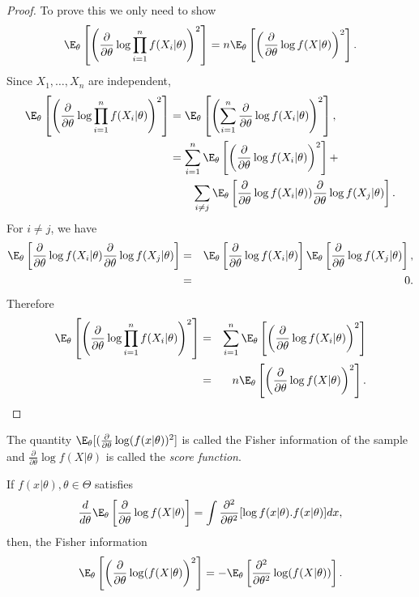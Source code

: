 \documentclass[a4paper,english,12pt]{article}
\begin{document}
\begin{proof}
To prove this we only need to show
\begin{equation}
\E_\theta\left[\left(\frac{\partial}{\partial\theta} \log \prod_{i=1}^{n} f(X_i|\theta)\right)^2\right] = n\E_\theta\left[\left(\frac{\partial}{\partial\theta} \log f(X|\theta)\right)^2\right].
\end{equation}
Since $X_1,\dots, X_n$ are independent,
\begin{align*}
\E_\theta\left[\left(\frac{\partial}{\partial\theta} \log \prod_{i=1}^{n} f(X_i|\theta)\right)^2\right]&= \E_\theta\left[\left(\sum_{i=1}^{n}\frac{\partial}{\partial\theta} \log  f(X_i|\theta)\right)^2\right], \\
&= \sum_{i=1}^{n}\E_\theta\left[\left(\frac{\partial}{\partial\theta} \log  f(X_i|\theta)\right)^2\right] +\\&\hspace{20pt} \sum_{i \neq j}\E_\theta\left[\frac{\partial}{\partial\theta} \log  f(X_i|\theta))\frac{\partial}{\partial\theta} \log  f(X_j|\theta)\right].
\end{align*}
For $i\neq j$, we have
\begin{eqnarray*}
\E_\theta\left[\frac{\partial}{\partial\theta} \log  f(X_i|\theta)\frac{\partial}{\partial\theta} \log  f(X_j|\theta)\right] &=& \E_\theta\left[\frac{\partial}{\partial\theta} \log  f(X_i|\theta)\right]\E_\theta\left[\frac{\partial}{\partial\theta} \log  f(X_j|\theta)\right], \\
&=& 0.
\end{eqnarray*}
Therefore
\begin{eqnarray}
\E_\theta\left[\left(\frac{\partial}{\partial\theta} \log \prod_{i=1}^{n} f(X_i|\theta)\right)^2\right] &=& \sum_{i=1}^{n}\E_\theta\left[\left(\frac{\partial}{\partial\theta} \log  f(X_i|\theta)\right)^2\right] \nonumber\\
&=& n\E_\theta\left[\left(\frac{\partial}{\partial\theta} \log f(X|\theta)\right)^2\right].
\end{eqnarray}
\end{proof}
The quantity $\E_\theta[(\frac{\partial}{\partial\theta} \log(f(x|\theta))^2]$ is called the Fisher information of the sample and $\frac{\partial}{\partial\theta} \log f(X|\theta)$ is called the {\it score function}.
\begin{lem}
If $f(x|\theta), \theta \in \Theta$ satisfies
\begin{equation*}
\frac{d}{d\theta} \E_\theta\left[\frac{\partial}{\partial\theta} \log f(X|\theta)\right] = \int \frac{\partial^2}{\partial\theta^2}[\log f(x|\theta).f(x|\theta)] dx,
\end{equation*}
then, the Fisher information
\begin{equation}
\E_\theta\left[\left(\frac{\partial}{\partial\theta} \log(f(X|\theta)\right)^2\right] = -\E_\theta\left[\frac{\partial^2}{\partial\theta^2}\log(f(X|\theta))\right].
\end{equation}
\end{lem}
\end{document}
